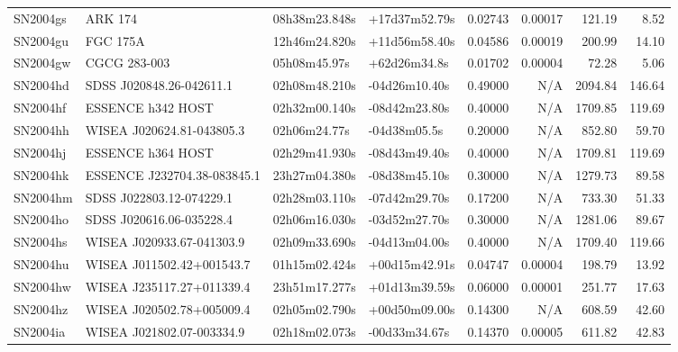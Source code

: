 \begin{longtable}{llllrrrr}
SN2004gs         &                         ARK 174 &   08h38m23.848s &   +17d37m52.79s &  0.02743 &  0.00017 &   121.19 &        8.52 \\
SN2004gu         &                        FGC 175A &   12h46m24.820s &   +11d56m58.40s &  0.04586 &  0.00019 &   200.99 &       14.10 \\
SN2004gw         &                    CGCG 283-003 &    05h08m45.97s &    +62d26m34.8s &  0.01702 &  0.00004 &    72.28 &        5.06 \\
SN2004hd         &        SDSS J020848.26-042611.1 &   02h08m48.210s &   -04d26m10.40s &  0.49000 &      N/A &  2094.84 &      146.64 \\
SN2004hf         &               ESSENCE h342 HOST &   02h32m00.140s &   -08d42m23.80s &  0.40000 &      N/A &  1709.85 &      119.69 \\
SN2004hh         &       WISEA J020624.81-043805.3 &    02h06m24.77s &    -04d38m05.5s &  0.20000 &      N/A &   852.80 &       59.70 \\
SN2004hj         &               ESSENCE h364 HOST &   02h29m41.930s &   -08d43m49.40s &  0.40000 &      N/A &  1709.81 &      119.69 \\
SN2004hk         &     ESSENCE J232704.38-083845.1 &   23h27m04.380s &   -08d38m45.10s &  0.30000 &      N/A &  1279.73 &       89.58 \\
SN2004hm         &        SDSS J022803.12-074229.1 &   02h28m03.110s &   -07d42m29.70s &  0.17200 &      N/A &   733.30 &       51.33 \\
SN2004ho         &        SDSS J020616.06-035228.4 &   02h06m16.030s &   -03d52m27.70s &  0.30000 &      N/A &  1281.06 &       89.67 \\
SN2004hs         &       WISEA J020933.67-041303.9 &   02h09m33.690s &   -04d13m04.00s &  0.40000 &      N/A &  1709.40 &      119.66 \\
SN2004hu         &       WISEA J011502.42+001543.7 &   01h15m02.424s &   +00d15m42.91s &  0.04747 &  0.00004 &   198.79 &       13.92 \\
SN2004hw         &       WISEA J235117.27+011339.4 &   23h51m17.277s &   +01d13m39.59s &  0.06000 &  0.00001 &   251.77 &       17.63 \\
SN2004hz         &       WISEA J020502.78+005009.4 &   02h05m02.790s &   +00d50m09.00s &  0.14300 &      N/A &   608.59 &       42.60 \\
SN2004ia         &       WISEA J021802.07-003334.9 &   02h18m02.073s &   -00d33m34.67s &  0.14370 &  0.00005 &   611.82 &       42.83 \\

\end{longtable}
